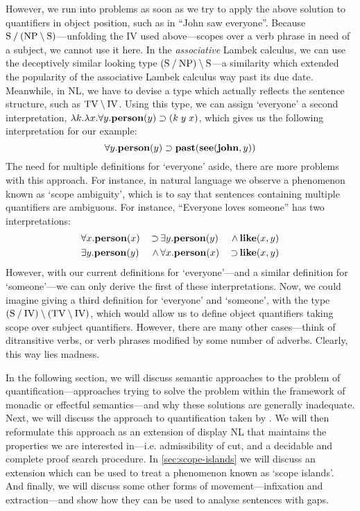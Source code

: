 However, we run into problems as soon as we try to apply the above
solution to quantifiers in object position, such as in ``John saw
everyone''. Because $\text{S}\mathbin{\slash}(\text{NP}\mathbin{\backslash}\text{S})$---unfolding the IV used
above---scopes over a verb phrase in need of a subject, we cannot use
it here. In the \emph{associative} Lambek calculus, we can use the
deceptively similar looking type $(\text{S}\mathbin{\slash}\text{NP})\mathbin{\backslash}\text{S}$---a similarity
which extended the popularity of the associative Lambek calculus way
past its due date. Meanwhile, in NL, we have to devise a type which
actually reflects the sentence structure, such as $\text{TV}\mathbin{\backslash}\text{IV}$. Using
this type, we can assign `everyone' a second interpretation,
$\lambda{k}.\lambda{x}.\forall{y}.\mathbf{person}(y)\supset(k\;y\;x)$, which
gives us the following interpretation for our example:
\[
  \forall{y}.\mathbf{person}(y)\supset\mathbf{past}(\mathbf{see}(\mathbf{john},y))
\]
The need for multiple definitions for `everyone' aside, there are more
problems with this approach. For instance, in natural language we
observe a phenomenon known as `scope ambiguity', which is to say that
sentences containing multiple quantifiers are ambiguous. For instance,
``Everyone loves someone'' has two interpretations:
\begin{alignat*}{3}
  &\forall x.\mathbf{person}(x) \,&\supset \,&\exists y.\mathbf{person}(y) \,&\wedge  \,&\mathbf{like}(x,y)\\
  &\exists y.\mathbf{person}(y) \,&\wedge  \,&\forall x.\mathbf{person}(x) \,&\supset \,&\mathbf{like}(x,y)
\end{alignat*}
However, with our current definitions for `everyone'---and a similar
definition for `someone'---we can only derive the first of these
interpretations. Now, we could imagine giving a third definition for
`everyone' and `someone', with the type $(\text{S}\mathbin{\slash}\text{IV})\mathbin{\backslash}(\text{TV}\mathbin{\backslash}\text{IV})$,
which would allow us to define object quantifiers taking scope over
subject quantifiers. However, there are many other cases---think of
ditransitive verbs, or verb phrases modified by some number of
adverbs. Clearly, this way lies madness.

In the following section, we will discuss semantic approaches to the
problem of quantification---approaches trying to solve the problem
within the framework of monadic or effectful semantics---and why these
solutions are generally inadequate.
Next, we will discuss the approach to quantification taken by
\citet{barker2007,barker2015}. We will then reformulate this approach
as an extension of display NL that maintains the properties we are
interested in---i.e. admissibility of cut, and a decidable and complete
proof search procedure. In \autoref{sec:scope-islands} we will discuss
an extension which can be used to treat a phenomenon known as `scope
islands'. And finally, we will discuss some other forms of
movement---infixation and extraction---and show how they can be used
to analyse sentences with gaps.

